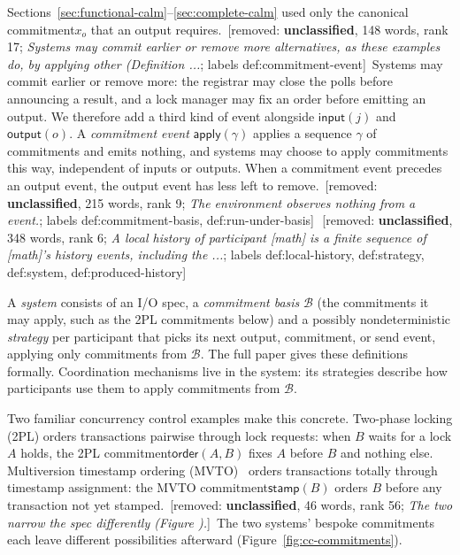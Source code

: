 \documentclass[sigconf]{cidr-2027}
\theoremstyle{remark}
\newcommand{\commitment}{commitment\xspace}
\newcommand{\commitments}{commitments\xspace}
\newif\ifshowrv \showrvfalse
\newcommand{\rv}[1]{\ifshowrv\textsuperscript{\textcolor{magenta}{\textbf{R#1}}}\fi}
\newcommand{\removednote}[1]{{\color{cutred}\footnotesize\,[removed: #1]\,}}
\begin{document}
Sections~\ref{sec:functional-calm}--\ref{sec:complete-calm} used only the
canonical \commitment $x_o$ that an output requires. \removednote{\textbf{unclassified}, 148 words, rank 17; \textit{Systems may commit earlier or remove more alternatives, as these examples do, by applying other (Definition ...}; labels def:commitment-event} \textcolor{newblue}{Systems may commit
earlier or remove more: the registrar may close the polls before announcing a
result, and a lock manager may fix an order before emitting an output.} \textcolor{newblue}{We therefore add a third kind of event alongside $\mathsf{input}(j)$ and
$\mathsf{output}(o)$.} \textcolor{newblue}{A \emph{\commitment event} $\mathsf{apply}(\gamma)$
applies a sequence $\gamma$ of \commitments and emits nothing, and systems may
choose to apply \commitments this way, independent of inputs or outputs.} \textcolor{newblue}{When
a \commitment event precedes an output event, the output event has less left to
remove.} \removednote{\textbf{unclassified}, 215 words, rank 9; \textit{The environment observes nothing from a event.}; labels def:commitment-basis, def:run-under-basis} \removednote{\textbf{unclassified}, 348 words, rank 6; \textit{A local history of participant [math] is a finite sequence of [math]'s history events, including the ...}; labels def:local-history, def:strategy, def:system, def:produced-history}

\textcolor{newblue}{A \emph{system} consists of an I/O spec, a \emph{\commitment basis} $\mathcal B$ (the \commitments it may apply, such
as the 2PL \commitments below)\rv{9} and a
possibly nondeterministic \emph{strategy} per participant that picks its next output,
\commitment, or send event, applying only
\commitments from $\mathcal B$.} \textcolor{newblue}{The full paper gives these definitions formally.} \textcolor{newblue}{Coordination mechanisms live in the system: its
strategies describe how participants use them to apply \commitments from $\mathcal B$.}

\textcolor{newblue}{Two familiar concurrency control examples make this concrete.} Two-phase locking
(2PL) orders transactions pairwise through lock requests: when $B$ waits for a
lock $A$ holds, the 2PL \commitment $\mathsf{order}(A,B)$ fixes $A$ before $B$ and nothing else. \textcolor{newblue}{Multiversion timestamp ordering (MVTO)~\cite{bernstein1981concurrency} orders transactions totally through timestamp
assignment: the MVTO \commitment $\mathsf{stamp}(B)$ orders $B$ before any transaction not yet
stamped.} \removednote{\textbf{unclassified}, 46 words, rank 56; \textit{The two narrow the spec differently (Figure ).}} \textcolor{newblue}{The two systems' bespoke \commitments each leave different possibilities
afterward (Figure~\ref{fig:cc-commitments}).}
\end{document}
